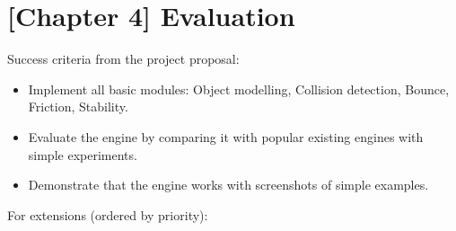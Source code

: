 \documentclass[runningheads]{llncs}
\begin{document}
\chapter{[Chapter 4] Evaluation}

Success criteria from the project proposal:

\begin{itemize}

\item Implement all basic modules: Object modelling, Collision detection, Bounce, Friction, Stability.

\item Evaluate the engine by comparing it with popular existing engines with simple experiments.

\item Demonstrate that the engine works with screenshots of simple examples.
\end{itemize}

For extensions (ordered by priority):
\end{document}
